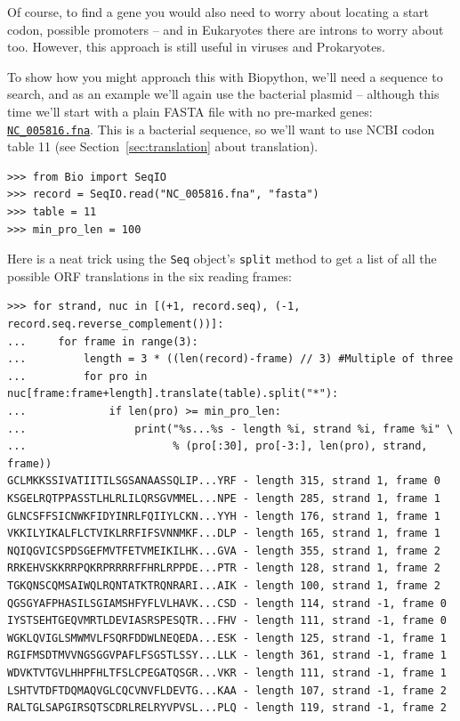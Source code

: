 \documentclass{report}
\begin{document}
Of course, to find a gene you would also need to worry about locating a start
codon, possible promoters -- and in Eukaryotes there are introns to worry about
too.  However, this approach is still useful in viruses and Prokaryotes.

To show how you might approach this with Biopython, we'll need a sequence to
search, and as an example we'll again use the bacterial plasmid -- although
this time we'll start with a plain FASTA file with no pre-marked genes:
\href{http://biopython.org/SRC/biopython/Tests/GenBank/NC_005816.fna}
{\texttt{NC\_005816.fna}}. This is a bacterial sequence, so we'll want to use
NCBI codon table 11 (see Section~\ref{sec:translation} about translation).

\begin{verbatim}
>>> from Bio import SeqIO 
>>> record = SeqIO.read("NC_005816.fna", "fasta")
>>> table = 11
>>> min_pro_len = 100
\end{verbatim}

Here is a neat trick using the \verb|Seq| object's \verb|split| method to
get a list of all the possible ORF translations in the six reading frames:

\begin{verbatim}
>>> for strand, nuc in [(+1, record.seq), (-1, record.seq.reverse_complement())]:
...     for frame in range(3):
...         length = 3 * ((len(record)-frame) // 3) #Multiple of three
...         for pro in nuc[frame:frame+length].translate(table).split("*"):
...             if len(pro) >= min_pro_len:
...                 print("%s...%s - length %i, strand %i, frame %i" \
...                       % (pro[:30], pro[-3:], len(pro), strand, frame))
GCLMKKSSIVATIITILSGSANAASSQLIP...YRF - length 315, strand 1, frame 0
KSGELRQTPPASSTLHLRLILQRSGVMMEL...NPE - length 285, strand 1, frame 1
GLNCSFFSICNWKFIDYINRLFQIIYLCKN...YYH - length 176, strand 1, frame 1
VKKILYIKALFLCTVIKLRRFIFSVNNMKF...DLP - length 165, strand 1, frame 1
NQIQGVICSPDSGEFMVTFETVMEIKILHK...GVA - length 355, strand 1, frame 2
RRKEHVSKKRRPQKRPRRRRFFHRLRPPDE...PTR - length 128, strand 1, frame 2
TGKQNSCQMSAIWQLRQNTATKTRQNRARI...AIK - length 100, strand 1, frame 2
QGSGYAFPHASILSGIAMSHFYFLVLHAVK...CSD - length 114, strand -1, frame 0
IYSTSEHTGEQVMRTLDEVIASRSPESQTR...FHV - length 111, strand -1, frame 0
WGKLQVIGLSMWMVLFSQRFDDWLNEQEDA...ESK - length 125, strand -1, frame 1
RGIFMSDTMVVNGSGGVPAFLFSGSTLSSY...LLK - length 361, strand -1, frame 1
WDVKTVTGVLHHPFHLTFSLCPEGATQSGR...VKR - length 111, strand -1, frame 1
LSHTVTDFTDQMAQVGLCQCVNVFLDEVTG...KAA - length 107, strand -1, frame 2
RALTGLSAPGIRSQTSCDRLRELRYVPVSL...PLQ - length 119, strand -1, frame 2
\end{verbatim}
\end{document}

